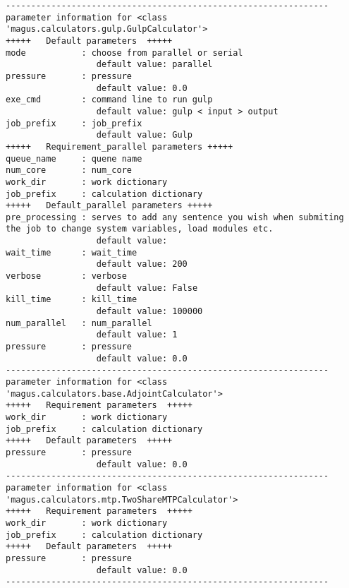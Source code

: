 \documentclass[12pt,oneside]{book}
\begin{document}
\begin{tcolorbox}
\begin{verbatim}
----------------------------------------------------------------
parameter information for <class 'magus.calculators.gulp.GulpCalculator'>
+++++	Default parameters	+++++
mode           : choose from parallel or serial
                  default value: parallel
pressure       : pressure
                  default value: 0.0
exe_cmd        : command line to run gulp
                  default value: gulp < input > output
job_prefix     : job_prefix
                  default value: Gulp
+++++	Requirement_parallel parameters	+++++
queue_name     : quene name
num_core       : num_core
work_dir       : work dictionary
job_prefix     : calculation dictionary
+++++	Default_parallel parameters	+++++
pre_processing : serves to add any sentence you wish when submiting the job to change system variables, load modules etc.
                  default value: 
wait_time      : wait_time
                  default value: 200
verbose        : verbose
                  default value: False
kill_time      : kill_time
                  default value: 100000
num_parallel   : num_parallel
                  default value: 1
pressure       : pressure
                  default value: 0.0
----------------------------------------------------------------
parameter information for <class 'magus.calculators.base.AdjointCalculator'>
+++++	Requirement parameters	+++++
work_dir       : work dictionary
job_prefix     : calculation dictionary
+++++	Default parameters	+++++
pressure       : pressure
                  default value: 0.0
----------------------------------------------------------------
parameter information for <class 'magus.calculators.mtp.TwoShareMTPCalculator'>
+++++	Requirement parameters	+++++
work_dir       : work dictionary
job_prefix     : calculation dictionary
+++++	Default parameters	+++++
pressure       : pressure
                  default value: 0.0
----------------------------------------------------------------
    \end{verbatim}
\end{tcolorbox}
\end{document}
